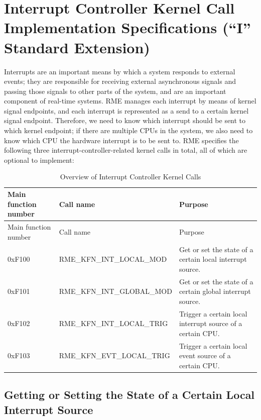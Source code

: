 \section{Interrupt Controller Kernel Call Implementation Specifications (``I'' Standard Extension)}\label{sec:8-interrupt-controller-kernel-calls}
\nopagebreak[4]

Interrupts are an important means by which a system responds to external events; they are responsible for receiving external asynchronous signals and passing those signals to other parts of the system, and are an important component of real-time systems. RME manages each interrupt by means of kernel signal endpoints, and each interrupt is represented as a send to a certain kernel signal endpoint. Therefore, we need to know which interrupt should be sent to which kernel endpoint; if there are multiple CPUs in the system, we also need to know which CPU the hardware interrupt is to be sent to. RME specifies the following three interrupt-controller-related kernel calls in total, all of which are optional to implement:

\begin{xltabular}{\textwidth}{@{}>{\hsize\raggedright\arraybackslash}X>{\hsize\raggedright\arraybackslash}X>{\hsize\raggedright\arraybackslash}X@{}}
\caption{Overview of Interrupt Controller Kernel Calls}\label{tab:8-15-interrupt-controller-kernel-calls}\\
\toprule
Main function number & Call name & Purpose\tabularnewline
\endfirsthead
\toprule
Main function number & Call name & Purpose\tabularnewline
\midrule
\endhead
\bottomrule
\endlastfoot
0xF100 & RME\_KFN\_INT\_LOCAL\_MOD &
Get or set the state of a certain local interrupt source.\tabularnewline
0xF101 & RME\_KFN\_INT\_GLOBAL\_MOD &
Get or set the state of a certain global interrupt source.\tabularnewline
0xF102 & RME\_KFN\_INT\_LOCAL\_TRIG &
Trigger a certain local interrupt source of a certain CPU.\tabularnewline
0xF103 & RME\_KFN\_EVT\_LOCAL\_TRIG &
Trigger a certain local event source of a certain CPU.\tabularnewline
\end{xltabular}
\nopagebreak[4]

\subsection{Getting or Setting the State of a Certain Local Interrupt Source}\label{subsec:8-get-or-set-local-interrupt-source-state}

